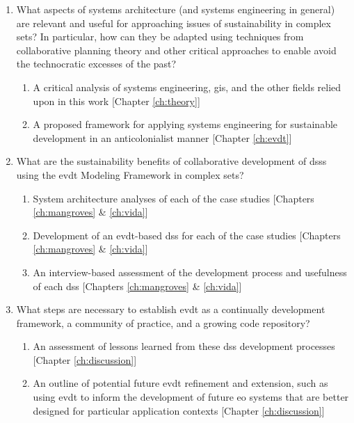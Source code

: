 \begin{enumerate}[itemsep=0pt,parsep=0pt]
	\item{What aspects of systems architecture (and systems engineering in general) are relevant and useful for approaching issues of sustainability in complex \ac{sets}? In particular, how can they be adapted using techniques from collaborative planning theory and other critical approaches to enable avoid the technocratic excesses of the past?}
	\begin{enumerate}[label=\emph{\alph*},itemsep=0pt,parsep=0pt]
		\item{A critical analysis of systems engineering, \ac{gis}, and the other fields relied upon in this work [Chapter \ref{ch:theory}] }
		\item{A proposed framework for applying systems engineering for sustainable development in an anticolonialist manner} [Chapter \ref{ch:evdt}]
	\end{enumerate}
	\item{What are the sustainability benefits of collaborative development of \acp{dss} using the \ac{evdt} Modeling Framework in complex \ac{sets}?}
	\begin{enumerate}[label=\emph{\alph*},itemsep=0pt,parsep=0pt]
		\item{System architecture analyses of each of the case studies [Chapters \ref{ch:mangroves} \& \ref{ch:vida}]} 
		\item{Development of an \ac{evdt}-based \ac{dss} for each of the case studies [Chapters \ref{ch:mangroves} \& \ref{ch:vida}]} 
		\item{An interview-based assessment of the development process and usefulness of each \ac{dss} [Chapters \ref{ch:mangroves} \& \ref{ch:vida}]} 
	\end{enumerate}
	\item{What steps are necessary to establish \ac{evdt} as a continually development framework, a community of practice, and a growing code repository?}
	\begin{enumerate}[label=\emph{\alph*},itemsep=0pt,parsep=0pt]
		\item{An assessment of lessons learned from these \ac{dss} development processes [Chapter \ref{ch:discussion}]} 
		\item{An outline of potential future \ac{evdt} refinement and extension, such as using \ac{evdt} to inform the development of future \ac{eo} systems that are better designed for particular application contexts [Chapter \ref{ch:discussion}]}
	\end{enumerate}
\end{enumerate}

